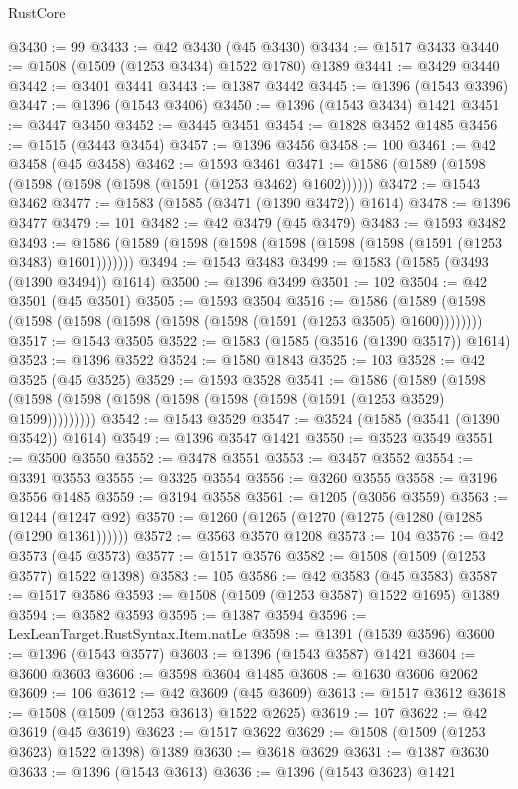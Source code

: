 \begin{lexlean}{RustCore}
\begin{coremodule}
@3430 := 99
@3433 := @42 @3430 (@45 @3430)
@3434 := @1517 @3433
@3440 := @1508 (@1509 (@1253 @3434) @1522 @1780) @1389
@3441 := @3429 @3440
@3442 := @3401 @3441
@3443 := @1387 @3442
@3445 := @1396 (@1543 @3396)
@3447 := @1396 (@1543 @3406)
@3450 := @1396 (@1543 @3434) @1421
@3451 := @3447 @3450
@3452 := @3445 @3451
@3454 := @1828 @3452 @1485
@3456 := @1515 (@3443 @3454)
@3457 := @1396 @3456
@3458 := 100
@3461 := @42 @3458 (@45 @3458)
@3462 := @1593 @3461
@3471 := @1586 (@1589 (@1598 (@1598 (@1598 (@1598 (@1591 (@1253 @3462) @1602))))))
@3472 := @1543 @3462
@3477 := @1583 (@1585 (@3471 (@1390 @3472)) @1614)
@3478 := @1396 @3477
@3479 := 101
@3482 := @42 @3479 (@45 @3479)
@3483 := @1593 @3482
@3493 := @1586 (@1589 (@1598 (@1598 (@1598 (@1598 (@1598 (@1591 (@1253 @3483) @1601)))))))
@3494 := @1543 @3483
@3499 := @1583 (@1585 (@3493 (@1390 @3494)) @1614)
@3500 := @1396 @3499
@3501 := 102
@3504 := @42 @3501 (@45 @3501)
@3505 := @1593 @3504
@3516 := @1586 (@1589 (@1598 (@1598 (@1598 (@1598 (@1598 (@1598 (@1591 (@1253 @3505) @1600))))))))
@3517 := @1543 @3505
@3522 := @1583 (@1585 (@3516 (@1390 @3517)) @1614)
@3523 := @1396 @3522
@3524 := @1580 @1843
@3525 := 103
@3528 := @42 @3525 (@45 @3525)
@3529 := @1593 @3528
@3541 := @1586
    (@1589 (@1598 (@1598 (@1598 (@1598 (@1598 (@1598 (@1598 (@1591 (@1253 @3529) @1599)))))))))
@3542 := @1543 @3529
@3547 := @3524 (@1585 (@3541 (@1390 @3542)) @1614)
@3549 := @1396 @3547 @1421
@3550 := @3523 @3549
@3551 := @3500 @3550
@3552 := @3478 @3551
@3553 := @3457 @3552
@3554 := @3391 @3553
@3555 := @3325 @3554
@3556 := @3260 @3555
@3558 := @3196 @3556 @1485
@3559 := @3194 @3558
@3561 := @1205 (@3056 @3559)
@3563 := @1244 (@1247 @92)
@3570 := @1260 (@1265 (@1270 (@1275 (@1280 (@1285 (@1290 @1361))))))
@3572 := @3563 @3570 @1208
@3573 := 104
@3576 := @42 @3573 (@45 @3573)
@3577 := @1517 @3576
@3582 := @1508 (@1509 (@1253 @3577) @1522 @1398)
@3583 := 105
@3586 := @42 @3583 (@45 @3583)
@3587 := @1517 @3586
@3593 := @1508 (@1509 (@1253 @3587) @1522 @1695) @1389
@3594 := @3582 @3593
@3595 := @1387 @3594
@3596 := LexLeanTarget.RustSyntax.Item.natLe
@3598 := @1391 (@1539 @3596)
@3600 := @1396 (@1543 @3577)
@3603 := @1396 (@1543 @3587) @1421
@3604 := @3600 @3603
@3606 := @3598 @3604 @1485
@3608 := @1630 @3606 @2062
@3609 := 106
@3612 := @42 @3609 (@45 @3609)
@3613 := @1517 @3612
@3618 := @1508 (@1509 (@1253 @3613) @1522 @2625)
@3619 := 107
@3622 := @42 @3619 (@45 @3619)
@3623 := @1517 @3622
@3629 := @1508 (@1509 (@1253 @3623) @1522 @1398) @1389
@3630 := @3618 @3629
@3631 := @1387 @3630
@3633 := @1396 (@1543 @3613)
@3636 := @1396 (@1543 @3623) @1421

\end{coremodule}
\end{lexlean}
